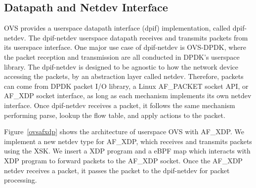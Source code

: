 \documentclass[10pt,numbers,reprint]{sigplanconf}
\begin{document}
\subsection{Datapath and Netdev Interface}
OVS provides a userspace datapath interface (dpif) implementation, called
dpif-netdev. The dpif-netdev userspace datapath receives and transmits
packets from its userspace interface.  One major use case of dpif-netdev
is OVS-DPDK, where the packet reception and transmission
are all conducted in DPDK's userspace
library. The dpif-netdev is designed to be agnostic to how the network
device accessing the packets, by an abstraction layer called netdev.
Therefore, packets can come from DPDK packet I/O library,
a Linux AF\_PACKET socket API, or AF\_XDP socket interface,
as long as each mechanism implements its own netdev interface.
Once dpif-netdev receives a packet, it follows the same mechanism performing
parse, lookup the flow table, and apply actions to the packet.

Figure~\ref{ovsafxdp} shows the architecture of userspace OVS with AF\_XDP.
We implement a new netdev type for AF\_XDP, which receives and transmits
packets using the XSK.  We insert a XDP program and a eBPF map which interacts
with XDP program to forward packets to the AF\_XDP socket.
Once the AF\_XDP netdev receives a packet, it passes the packet to the
dpif-netdev for packet processing.
\end{document}
